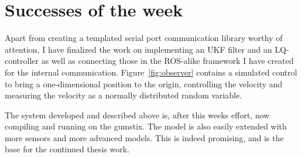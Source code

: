 \section{Successes of the week}
Apart from creating a templated serial port communication library worthy of attention,
I have finalized the work on implementing an UKF filter and an LQ-controller as well
as connecting those in the ROS-alike framework I have created for the internal communication.
Figure~\ref{fig:observer} contains a simulated control to bring a one-dimensional
position to the origin, controlling the velocity and measuring the velocity as
a normally distributed random variable.


The system developed and described above is, after this weeks effort, now compiling and running
on the gumstix. The model is also easily extended with more sensors and more advanced models.
This is indeed promising, and is the base for the continued thesis work.
